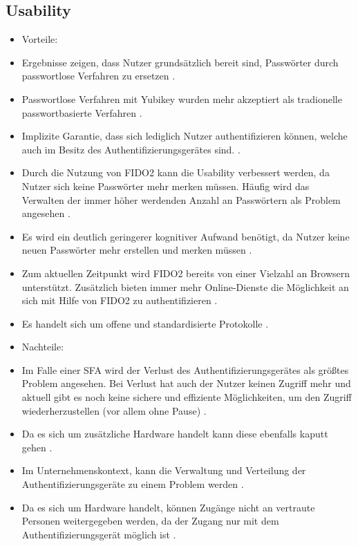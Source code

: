\subsection{Usability}

\begin{itemize}
    \item Vorteile:
    \item Ergebnisse zeigen, dass Nutzer grundsätzlich bereit sind, Passwörter durch passwortlose Verfahren zu ersetzen \cite{lyastani2020fido2}.
    \item Passwortlose Verfahren mit Yubikey wurden mehr akzeptiert als tradionelle passwortbasierte Verfahren \cite{lyastani2020fido2}.
    \item Implizite Garantie, dass sich lediglich Nutzer authentifizieren können, welche auch im Besitz des Authentifizierungsgerätes sind. \cite{lyastani2020fido2}.
    \item Durch die Nutzung von FIDO2 kann die Usability verbessert werden, da Nutzer sich keine Passwörter mehr merken müssen. Häufig wird das Verwalten der immer höher werdenden Anzahl an Passwörtern als Problem angesehen \cite{lyastani2020fido2} \cite{farke2020you}.
    \item Es wird ein deutlich geringerer kognitiver Aufwand benötigt, da Nutzer keine neuen Passwörter mehr erstellen und merken müssen \cite{lyastani2020fido2}.
    \item Zum aktuellen Zeitpunkt wird FIDO2 bereits von einer Vielzahl an Browsern unterstützt. Zusätzlich bieten immer mehr Online-Dienste die Möglichkeit an sich mit Hilfe von FIDO2 zu authentifizieren \cite{lyastani2020fido2} \cite{farke2020you}.
    \item Es handelt sich um offene und standardisierte Protokolle \cite{farke2020you}.
    \item Nachteile:
    \item Im Falle einer \ac{SFA} wird der Verlust des Authentifizierungsgerätes als größtes Problem angesehen. Bei Verlust hat auch der Nutzer keinen Zugriff mehr und aktuell gibt es noch keine sichere und effiziente Möglichkeiten, um den Zugriff wiederherzustellen (vor allem ohne Pause) \cite{lyastani2020fido2}.
    \item Da es sich um zusätzliche Hardware handelt kann diese ebenfalls kaputt gehen \cite{farke2020you}.
    \item Im Unternehmenskontext, kann die Verwaltung und Verteilung der Authentifizierungsgeräte zu einem Problem werden \cite{farke2020you}. 
    \item Da es sich um Hardware handelt, können Zugänge nicht an vertraute Personen weitergegeben werden, da der Zugang nur mit dem Authentifizierungsgerät möglich ist \cite{lyastani2020fido2}.

\end{itemize}
